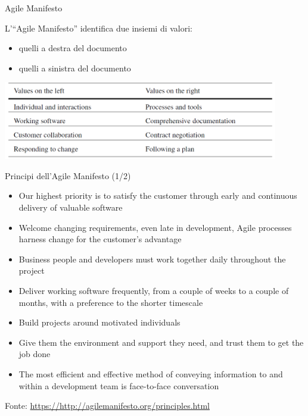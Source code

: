 \documentclass{beamer}
\begin{document}
\begin{frame}{\centerline{Agile Manifesto}}


L'``Agile Manifesto'' identifica due insiemi di valori:
\begin{itemize}
    \item quelli a destra del documento
    \item quelli a sinistra del documento
\end{itemize}

\begin{center}
\includegraphics[width=120mm]{P2023.AIBCCSS.IlConcettoDiSoftware/img-img01.png}
\end{center}
\end{frame}

\begin{frame}{\centerline{Principi dell'Agile Manifesto (1/2)}}

\begin{itemize}
\item  Our highest priority is to satisfy the customer through early and continuous delivery of valuable software
\item  Welcome changing requirements, even late in development, Agile processes harness change for the customer's advantage
\item  Business people and developers must work together daily throughout the project
\item  Deliver working software frequently, from a couple of weeks to a couple of months, with a preference to the shorter timescale
\item  Build projects around motivated individuals
\item  Give them the environment and support they need, and trust them to get the job done
\item  The most efficient and effective method of conveying information to and within a development team is face-to-face conversation
\end{itemize}

\begin{center}
\tiny
Fonte: \url{https://http://agilemanifesto.org/principles.html}
\end{center}

\end{frame}
\end{document}
